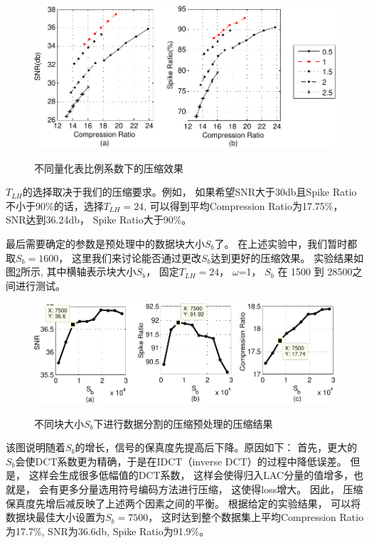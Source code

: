 \begin{figure}[htb]
  \centering
  \includegraphics[scale=0.9]{Pictures/Compression/f11-crop.pdf}\\
  \caption{不同量化表比例系数下的压缩效果}\label{fig:Comparison:TLH-2}
\end{figure}

$T_{LH}$的选择取决于我们的压缩要求。例如， 如果希望SNR大于30db且Spike Ratio不小于90\%的话，选择$T_{LH}=24$, 可以得到平均Compression Ratio为17.75\%， SNR达到36.24db， Spike Ratio大于90\%。 

最后需要确定的参数是预处理中的数据块大小$S_b$了。 在上述实验中，我们暂时都取$S_b = 1600$， 这里我们来讨论能否通过更改$S_b$达到更好的压缩效果。 实验结果如图\ref{fig:Comparison:Sb}所示, 其中横轴表示块大小$S_b$， 固定$T_{LH}=24$， $\omega$=1，  $S_b$ 在 1500 到 28500之间进行测试。


\begin{figure}[htb]
  \centering
  \includegraphics[scale = 1.1]{Pictures/Compression/f12-crop.pdf}\\
  \caption{不同块大小$S_b$下进行数据分割的压缩预处理的压缩结果}\label{fig:Comparison:Sb}
\end{figure}


该图说明随着$S_b$的增长，信号的保真度先提高后下降。原因如下：
首先，更大的$S_b$会使DCT系数更为精确，于是在IDCT（inverse DCT）的过程中降低误差。 但是， 这样会生成很多低幅值的DCT系数， 这样会使得归入LAC分量的值增多，也就是， 会有更多分量选用符号编码方法进行压缩， 这使得loss增大。 因此， 压缩保真度先增后减反映了上述两个因素之间的平衡。 根据给定的实验结果， 可以将数据块最佳大小设置为$S_b = 7500$， 这时达到整个数据集上平均Compression Ratio为17.7\%, SNR为36.6db, Spike Ratio为91.9\%。


